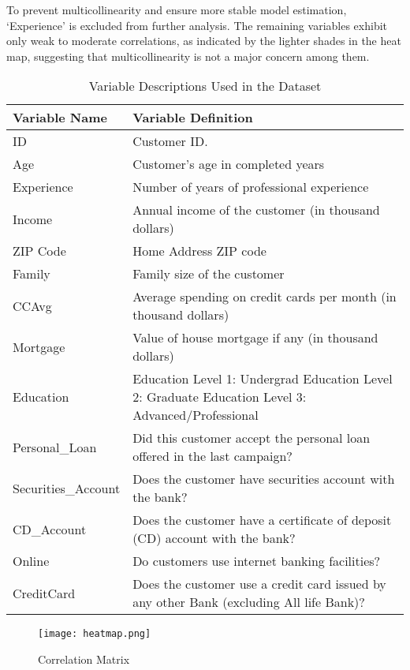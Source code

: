 \documentclass[12pt]{article}
\begin{document}
To prevent multicollinearity and ensure more stable model estimation, ‘Experience’ is excluded from further analysis. The remaining variables exhibit only weak to moderate correlations, as indicated by the lighter shades in the heat map, suggesting that multicollinearity is not a major concern among them.
\begin{table}[htbp]
\centering
\renewcommand{\arraystretch}{1.5} %
\begin{tabular}{|p{4cm}|p{10cm}|}
\hline
\textbf{Variable Name} & \textbf{Variable Definition} \\
\hline
ID & Customer ID. \\
\hline
Age & Customer’s age in completed years \\
\hline
Experience & Number of years of professional experience \\
\hline
Income & Annual income of the customer (in thousand dollars) \\
\hline
ZIP Code & Home Address ZIP code \\
\hline
Family & Family size of the customer \\
\hline
CCAvg & Average spending on credit cards per month (in thousand dollars) \\
\hline
Mortgage & Value of house mortgage if any (in thousand dollars) \\
\hline
Education & Education Level 1: Undergrad \newline Education Level 2: Graduate \newline Education Level 3: Advanced/Professional \\
\hline
Personal\_Loan & Did this customer accept the personal loan offered in the last campaign? \\
\hline
Securities\_Account & Does the customer have securities account with the bank? \\
\hline
CD\_Account & Does the customer have a certificate of deposit (CD) account with the bank? \\
\hline
Online & Do customers use internet banking facilities? \\
\hline
CreditCard & Does the customer use a credit card issued by any other Bank (excluding All life Bank)? \\
\hline
\end{tabular}
\caption{Variable Descriptions Used in the Dataset}
\label{tab:appendix1}
\end{table}

\begin{figure}
    \centering
    \texttt{[image: heatmap.png]}
    \caption{Correlation Matrix}
    \label{fig:enter-label}
\end{figure}
\end{document}
